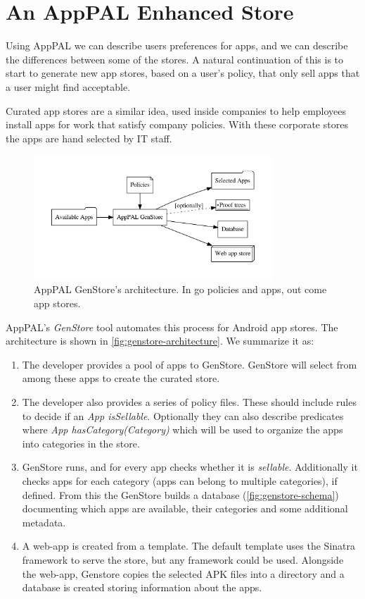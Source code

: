 \documentclass[thesis.tex]{subfiles}
\begin{document}
\section{An AppPAL Enhanced Store}

Using AppPAL we can describe users preferences for apps, and we can describe
the differences between some of the stores.  A natural continuation of this is
to start to generate new app stores, based on a user's policy, that only sell
apps that a user might find acceptable.

Curated app stores are a similar idea, used inside companies to help employees
install apps for work that satisfy company policies.  With these corporate stores the apps are hand selected
by IT staff.  

\begin{figure}\centering
  \includegraphics[width=0.8\textwidth]{figures/genstore.pdf}
  \caption[AppPAL GenStore's architecture.]{AppPAL GenStore's architecture.  In go policies and apps, out come app stores.}
  \label{fig:genstore-architecture}
\end{figure}

AppPAL's \emph{GenStore} tool automates this process for Android app stores. The
architecture is shown in \autoref{fig:genstore-architecture}. We summarize it
as:

\begin{enumerate}
\item The developer provides a pool of apps to GenStore. GenStore will select
  from among these apps to create the curated store.
\item The developer also provides a series of policy files. These should include
  rules to decide if an \emph{App isSellable}. Optionally they can also describe
  predicates where \emph{App hasCategory(Category)} which will be used to organize
  the apps into categories in the store.
\item GenStore runs, and for every app checks whether it is \emph{sellable}.
  Additionally it checks apps for each category (apps can belong to multiple
  categories), if defined. From this the GenStore builds a database
  (\autoref{fig:genstore-schema}) documenting which apps are available, their
  categories and some additional metadata.
\item A web-app is created from a template. The default template uses the Sinatra
  framework to serve the store, but any framework could be used. Alongside the
  web-app, Genstore copies the selected APK files into a directory and a database
  is created storing information about the apps.
\end{enumerate}
\end{document}
